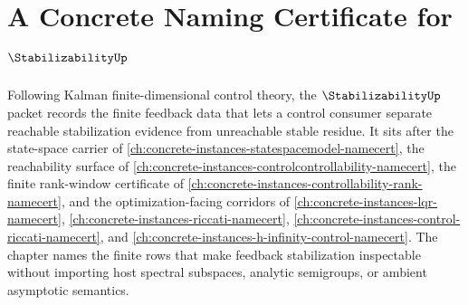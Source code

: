 \chapter{A Concrete Naming Certificate for $\StabilizabilityUp$}
\label{ch:concrete-instances-stabilizability-namecert}

Following Kalman finite-dimensional control theory, the $\StabilizabilityUp$ packet records the finite feedback data that lets a control consumer separate reachable stabilization evidence from unreachable stable residue. It sits after the state-space carrier of \autoref{ch:concrete-instances-statespacemodel-namecert}, the reachability surface of \autoref{ch:concrete-instances-controlcontrollability-namecert}, the finite rank-window certificate of \autoref{ch:concrete-instances-controllability-rank-namecert}, and the optimization-facing corridors of \autoref{ch:concrete-instances-lqr-namecert}, \autoref{ch:concrete-instances-riccati-namecert}, \autoref{ch:concrete-instances-control-riccati-namecert}, and \autoref{ch:concrete-instances-h-infinity-control-namecert}. The chapter names the finite rows that make feedback stabilization inspectable without importing host spectral subspaces, analytic semigroups, or ambient asymptotic semantics.

